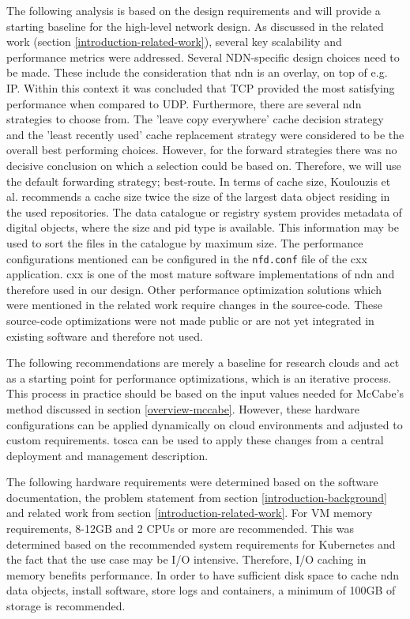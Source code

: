 The following analysis is based on the design requirements and will provide a starting baseline for the high-level network design. As discussed in the related work (section \ref{introduction-related-work}), several key scalability and performance metrics were addressed. Several NDN-specific design choices need to be made. These include the consideration that \gls{ndn} is an overlay, on top of e.g. IP. Within this context it was concluded that TCP provided the most satisfying performance when compared to UDP. Furthermore, there are several \gls{ndn} strategies to choose from. The 'leave copy everywhere' cache decision strategy and the 'least recently used' cache replacement strategy were considered to be the overall best performing choices. However, for the forward strategies there was no decisive conclusion on which a selection could be based on. Therefore, we will use the default forwarding strategy; best-route. In terms of cache size, Koulouzis et al. recommends a cache size twice the size of the largest data object residing in the used repositories. The data catalogue or registry system provides metadata of digital objects, where the size and \gls{pid} type is available. This information may be used to sort the files in the catalogue by maximum size. The performance configurations mentioned can be configured in the \texttt{nfd.conf} file of the \gls{cxx} application. \gls{cxx} is one of the most mature software implementations of \gls{ndn} and therefore used in our design. Other performance optimization solutions which were mentioned in the related work require changes in the source-code. These source-code optimizations were not made public or are not yet integrated in existing software and therefore not used.

The following recommendations are merely a baseline for research clouds and act as a starting point for performance optimizations, which is an iterative process. This process in practice should be based on the input values needed for McCabe's method discussed in section \ref{overview-mccabe}. However, these hardware configurations can be applied dynamically on cloud environments and adjusted to custom requirements. \gls{tosca} can be used to apply these changes from a central deployment and management description.

The following hardware requirements were determined based on the software documentation, the problem statement from section \ref{introduction-background} and related work from section \ref{introduction-related-work}. For VM memory requirements, 8-12GB and 2 CPUs or more are recommended. This was determined based on the recommended system requirements for Kubernetes \cite{kubernetes-system-requirements} and the fact that the use case may be I/O intensive. Therefore, I/O caching in memory benefits performance. In order to have sufficient disk space to cache \gls{ndn} data objects, install software, store logs and containers, a minimum of 100GB of storage is recommended.


